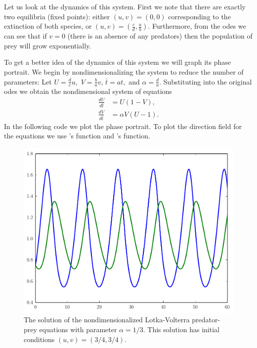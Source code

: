 Let us look at the dynamics of this system.
First we note that there are exactly two equilibria (fixed points): either $(u,v) = (0,0)$ corresponding to the extinction of both species, or $(u,v) = (\frac{c}{d},\frac{a}{b})$.
Furthermore, from the odes we can see that if $v=0$ (there is an absence of any predators) then the population of prey will grow exponentially.

To get a better idea of the dynamics of this system we will graph its phase portrait.
We begin by nondimensionalizing the system to reduce the number of parameters:
Let $U = \frac{d}{c}u,$ $V = \frac{b}{a}v$, $\bar{t} = at,$ and $\alpha = \frac{d}{a}$.
Substituting into the original odes we obtain the nondimensional system of equations
\begin{align*}
	\frac{dU}{d\bar{t}} &= U(1-V),\\
	\frac{dV}{d\bar{t}} &= \alpha V (U-1).
\end{align*}
In the following code we plot the phase portrait.
To plot the direction field for the equations we use 's  function and 's  function.

\begin{figure}
\centering
\includegraphics[width=\textwidth]{Lotka_Volterra.pdf}
\caption{The solution of the nondimensionalized Lotka-Volterra predator-prey equations with parameter $\alpha = 1/3$. 
This solution has initial conditions $(u,v) = (3/4, 3/4)$.}
\label{fig:pred-prey_Lotka_Voterra}
\end{figure}


